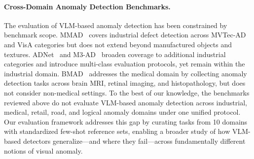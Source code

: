\paragraph{Cross-Domain Anomaly Detection Benchmarks.}
The evaluation of VLM-based anomaly detection has been constrained by benchmark scope.
MMAD~\cite{jiang2024mmad} covers industrial defect detection across MVTec-AD and VisA categories but does not extend beyond manufactured objects and textures.
ADNet~\cite{li2025adnet} and M3-AD~\cite{chen2025m3ad} broaden coverage to additional industrial categories and introduce multi-class evaluation protocols, yet remain within the industrial domain.
BMAD~\cite{bao2024bmad} addresses the medical domain by collecting anomaly detection tasks across brain MRI, retinal imaging, and histopathology, but does not consider non-medical settings.
To the best of our knowledge, the benchmarks reviewed above do not evaluate VLM-based anomaly detection across industrial, medical, retail, road, and logical anomaly domains under one unified protocol.
Our evaluation framework addresses this gap by curating tasks from 10 domains with standardized few-shot reference sets, enabling a broader study of how VLM-based detectors generalize---and where they fail---across fundamentally different notions of visual anomaly.
